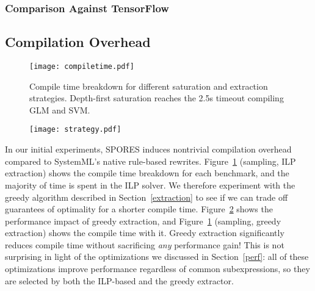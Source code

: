 \subsubsection*{Comparison Against TensorFlow}
\subsection{Compilation Overhead} \label{overhead}
\begin{figure}
    \texttt{[image: compiletime.pdf]}
    \caption{Compile time breakdown for different saturation and extraction
      strategies. Depth-first saturation reaches the 2.5s timeout compiling GLM and SVM. }
    \label{compile}
    \vspace{5pt}
\end{figure}{}
\begin{figure}
    \centering  \texttt{[image: strategy.pdf]}
    \caption{} 
    \label{sampleeval}
\end{figure}

In our initial experiments, SPORES induces nontrivial compilation
overhead compared to SystemML's native rule-based rewrites. Figure~\ref{compile}
 (sampling, ILP extraction) shows the compile time breakdown for each benchmark, and the majority of time is
spent in the ILP solver. We therefore experiment with the greedy algorithm 
described in Section~\ref{extraction}
 to see if we can trade off guarantees of optimality for a shorter
compile time. Figure~\ref{sampleeval}
shows the performance impact of greedy extraction, and Figure~\ref{compile} (sampling, greedy extraction)
shows the compile time with it. Greedy extraction significantly reduces compile
time without sacrificing \textit{any} performance gain! This is not surprising
in light of the optimizations we discussed in Section~\ref{perf}: all of
these optimizations improve performance regardless of common
subexpressions, so they are selected by both the ILP-based and the greedy
extractor.

